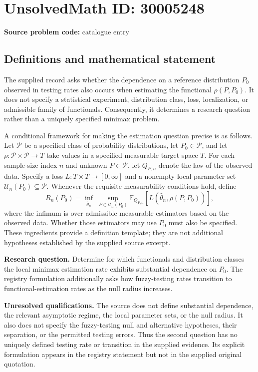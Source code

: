 \documentclass[11pt]{article}
\begin{document}
\section*{UnsolvedMath ID: 30005248}
\textbf{Source problem code:} catalogue entry
\subsection{Definitions and mathematical statement}
The supplied record asks whether the dependence on a reference distribution \(P_0\) observed in testing rates also occurs when estimating the functional \(\rho(P,P_0)\). It does not specify a statistical experiment, distribution class, loss, localization, or admissible family of functionals. Consequently, it determines a research question rather than a uniquely specified minimax problem.

A conditional framework for making the estimation question precise is as follows. Let \(\mathcal P\) be a specified class of probability distributions, let \(P_0\in\mathcal P\), and let \(\rho:\mathcal P\times\mathcal P\to T\) take values in a specified measurable target space \(T\). For each sample-size index \(n\) and unknown \(P\in\mathcal P\), let \(Q_{P,n}\) denote the law of the observed data. Specify a loss \(L:T\times T\to[0,\infty]\) and a nonempty local parameter set \(\mathcal U_n(P_0)\subseteq\mathcal P\). Whenever the requisite measurability conditions hold, define
\[
R_n(P_0)=\inf_{\widehat\theta_n}\;\sup_{P\in\mathcal U_n(P_0)}
\mathbb E_{Q_{P,n}}\!\left[L\!\left(\widehat\theta_n,\rho(P,P_0)\right)\right],
\]
where the infimum is over admissible measurable estimators based on the observed data. Whether those estimators may use \(P_0\) must also be specified. These ingredients provide a definition template; they are not additional hypotheses established by the supplied source excerpt.

\textbf{Research question.} Determine for which functionals and distribution classes the local minimax estimation rate exhibits substantial dependence on \(P_0\). The registry formulation additionally asks how fuzzy-testing rates transition to functional-estimation rates as the null radius increases.

\textbf{Unresolved qualifications.} The source does not define substantial dependence, the relevant asymptotic regime, the local parameter sets, or the null radius. It also does not specify the fuzzy-testing null and alternative hypotheses, their separation, or the permitted testing errors. Thus the second question has no uniquely defined testing rate or transition in the supplied evidence. Its explicit formulation appears in the registry statement but not in the supplied original quotation.
\end{document}
